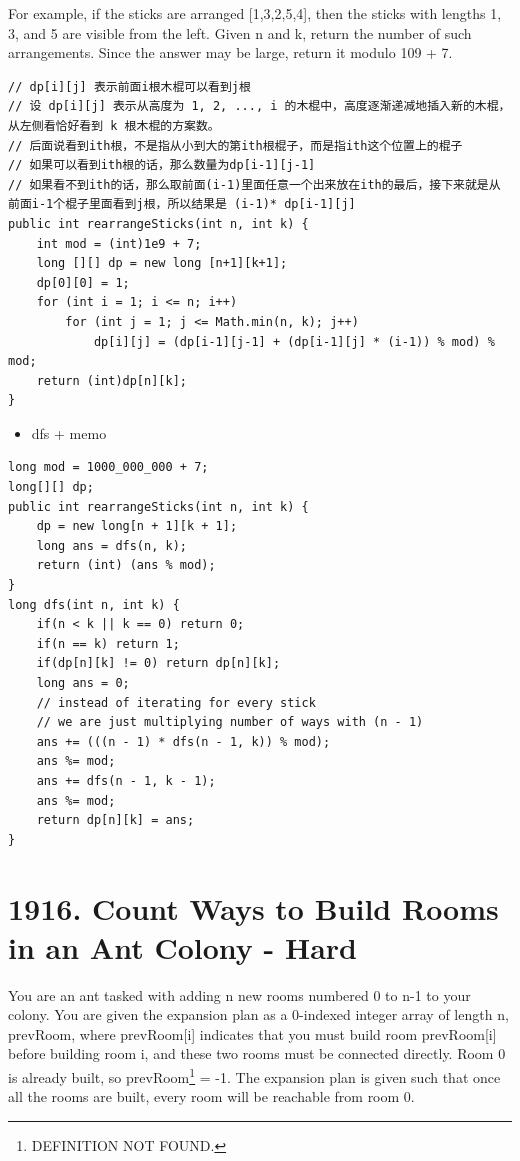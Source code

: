 \documentclass[9pt, b5paaper]{book}
\begin{document}
For example, if the sticks are arranged [1,3,2,5,4], then the sticks with lengths 1, 3, and 5 are visible from the left.
Given n and k, return the number of such arrangements. Since the answer may be large, return it modulo 109 + 7.
\begin{verbatim}
// dp[i][j] 表示前面i根木棍可以看到j根
// 设 dp[i][j] 表示从高度为 1, 2, ..., i 的木棍中，高度逐渐递减地插入新的木棍，从左侧看恰好看到 k 根木棍的方案数。
// 后面说看到ith根，不是指从小到大的第ith根棍子，而是指ith这个位置上的棍子
// 如果可以看到ith根的话，那么数量为dp[i-1][j-1]
// 如果看不到ith的话，那么取前面(i-1)里面任意一个出来放在ith的最后，接下来就是从前面i-1个棍子里面看到j根，所以结果是 (i-1)* dp[i-1][j]
public int rearrangeSticks(int n, int k) {
    int mod = (int)1e9 + 7;
    long [][] dp = new long [n+1][k+1];
    dp[0][0] = 1;
    for (int i = 1; i <= n; i++) 
        for (int j = 1; j <= Math.min(n, k); j++) 
            dp[i][j] = (dp[i-1][j-1] + (dp[i-1][j] * (i-1)) % mod) % mod;
    return (int)dp[n][k];
}
\end{verbatim}
\begin{itemize}
\item dfs + memo
\end{itemize}
\begin{verbatim}
long mod = 1000_000_000 + 7;
long[][] dp;
public int rearrangeSticks(int n, int k) {
    dp = new long[n + 1][k + 1];
    long ans = dfs(n, k);
    return (int) (ans % mod);
}
long dfs(int n, int k) {
    if(n < k || k == 0) return 0;
    if(n == k) return 1;
    if(dp[n][k] != 0) return dp[n][k];
    long ans = 0;
    // instead of iterating for every stick
    // we are just multiplying number of ways with (n - 1)
    ans += (((n - 1) * dfs(n - 1, k)) % mod);
    ans %= mod;
    ans += dfs(n - 1, k - 1);
    ans %= mod;
    return dp[n][k] = ans;
}
\end{verbatim}

\section{1916. Count Ways to Build Rooms in an Ant Colony - Hard}
\label{sec-2-8}
You are an ant tasked with adding n new rooms numbered 0 to n-1 to your colony. You are given the expansion plan as a 0-indexed integer array of length n, prevRoom, where prevRoom[i] indicates that you must build room prevRoom[i] before building room i, and these two rooms must be connected directly. Room 0 is already built, so prevRoom\footnote{DEFINITION NOT FOUND.} = -1. The expansion plan is given such that once all the rooms are built, every room will be reachable from room 0.
\end{document}
